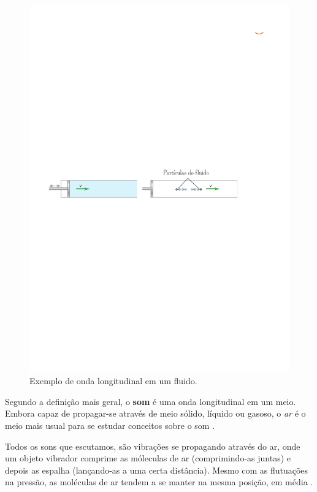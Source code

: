 \documentclass[
    12pt,               %
    openright,          %
    oneside,
    a4paper,            
    english,            %
    brazil              %
    ]{abntex2}
\begin{document}
\begin{itemize}
  \begin{figure}[!htb]
    \caption{\label{fig_onda-longitudinal}Exemplo de onda longitudinal em um fluido.}
    \begin{center}
    \includegraphics[scale=0.65]{images/img-2.pdf}
    \end{center}
  \end{figure}
\end{itemize} 

Segundo a definição mais geral, o \textbf{som} é uma onda longitudinal em um meio. Embora capaz de propagar-se através de meio sólido, líquido ou gasoso, o \textit{ar} é o meio mais usual para se estudar conceitos sobre o som \cite{young}.

Todos os sons que escutamos, são vibrações se propagando através do ar, onde um objeto vibrador comprime as móleculas de ar (comprimindo-as juntas) e depois as espalha (lançando-as a uma certa distância). Mesmo com as flutuações na pressão, as moléculas de ar tendem a se manter na mesma posição, em média \cite{soundtrack}. 
\end{document}
